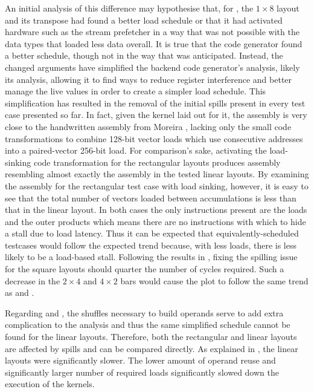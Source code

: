\documentclass[\main/thesis.tex]{subfiles}
\begin{document}
An initial analysis of this difference may hypothesise that, for , the $1 \times 8$ layout and its transpose had found a better load schedule or that it had activated hardware such as the stream prefetcher in a way that was not possible with the data types that loaded less data overall.
It is true that the code generator found a better schedule, though not in the way that was anticipated.
Instead, the changed arguments have simplified the backend code generator's analysis, likely its  analysis, allowing it to find ways to reduce register interference and better manage the \gls{live} values in order to create a simpler load schedule.
This simplification has resulted in the removal of the initial spills present in every test case presented so far.
In fact, given the kernel laid out for it, the assembly is very close to the handwritten assembly from Moreira \etal, lacking only the small code transformations to combine 128-bit vector loads which use consecutive addresses into a paired-vector 256-bit load.
For comparison's sake, activating the load-sinking code transformation for the rectangular layouts produces assembly resembling almost exactly the assembly in the tested linear layouts\footnotemark.
By examining the assembly for the rectangular test case with load sinking, however, it is easy to see that the total number of vectors loaded between accumulations is less than that in the linear layout.
In both cases the only instructions present are the loads and the outer products which means there are no instructions with which to hide a stall due to load latency.
Thus it can be expected that equivalently-scheduled  testcases would follow the expected trend because, with less loads, there is less likely to be a load-based stall.
Following the results in , fixing the spilling issue for the  square layouts should quarter the number of cycles required.
Such a decrease in the $2 \times 4$ and $4 \times 2$ bars would cause the  plot to follow the same trend as  and .

Regarding  and , the shuffles necessary to build operands serve to add extra complication to the  analysis and thus the same simplified schedule cannot be found for the linear layouts.
Therefore, both the rectangular and linear layouts are affected by spills and can be compared directly.
As explained in , the linear layouts were significantly slower.
The lower amount of operand reuse and significantly larger number of required loads significantly slowed down the execution of the kernels.
\end{document}
